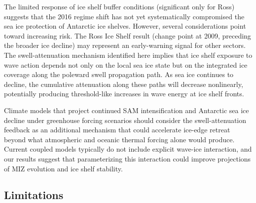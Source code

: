 \documentclass[11pt]{article}
\begin{document}
The limited response of ice shelf buffer conditions (significant only for Ross) suggests that the 2016 regime shift has not yet systematically compromised the sea ice protection of Antarctic ice shelves. However, several considerations point toward increasing risk. The Ross Ice Shelf result (change point at 2009, preceding the broader ice decline) may represent an early-warning signal for other sectors. The swell-attenuation mechanism identified here implies that ice shelf exposure to wave action depends not only on the local sea ice state but on the integrated ice coverage along the poleward swell propagation path. As sea ice continues to decline, the cumulative attenuation along these paths will decrease nonlinearly, potentially producing threshold-like increases in wave energy at ice shelf fronts.

Climate models that project continued SAM intensification and Antarctic sea ice decline under greenhouse forcing scenarios should consider the swell-attenuation feedback as an additional mechanism that could accelerate ice-edge retreat beyond what atmospheric and oceanic thermal forcing alone would produce. Current coupled models typically do not include explicit wave-ice interaction\cite{Squire2020}, and our results suggest that parameterizing this interaction could improve projections of MIZ evolution and ice shelf stability.

\subsection{Limitations}
\end{document}
